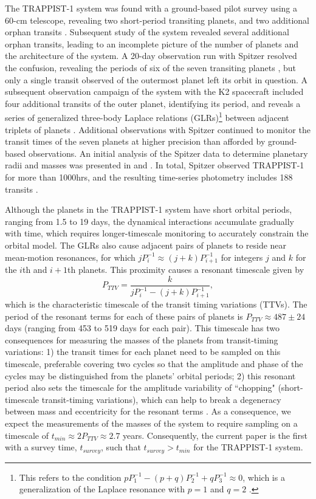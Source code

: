 \documentclass[twocolumn]{aastex63}
\begin{document}
The TRAPPIST-1 system was found with a ground-based pilot survey using a 60-cm telescope,
revealing two short-period transiting planets, and two additional orphan transits
\citep{Gillon2016, Burdanov2018}.  Subsequent study of the system revealed several
additional orphan transits, leading to an incomplete picture of the number of planets
and the architecture of the system.  A 20-day observation run with Spitzer resolved the
confusion, revealing the periods of six of the seven transiting planets \citep{Gillon2017},
but only a single transit observed of the outermost planet left its orbit in question.
A subsequent observation campaign of the system with the K2 spacecraft included four
additional transits of the outer planet, identifying its period, and reveals a series
of generalized three-body Laplace relations (GLRs)\footnote{This refers to the condition
$pP_1^{-1}-(p+q)P_2^{-1}+qP_3^{-1} \approx 0$, which is a generalization of the Laplace
resonance with $p=1$ and $q=2$ \citep{Papaloizou2014}. } between adjacent triplets of
planets \citep{Luger2017a}.  Additional observations with Spitzer
continued to monitor the transit times of the seven planets at higher precision than
afforded by ground-based observations. An initial analysis of the Spitzer data to determine
planetary radii and masses was presented in \citet{Delrez2018a} and \citet{Grimm2018}. In total,
Spitzer observed TRAPPIST-1 for more than 1000hrs, and the resulting time-series photometry
includes 188 transits \citep{Ducrot2020}.

Although the planets in the TRAPPIST-1 system have short orbital periods, ranging from
1.5 to 19 days, the dynamical interactions accumulate gradually with time, which requires
longer-timescale monitoring to accurately constrain the orbital model.
The GLRs also cause adjacent pairs of planets to reside near mean-motion resonances,
for which $j P_i^{-1} \approx (j+k) P_{i+1}^{-1}$ for integers $j$ and $k$ for the $i$th and $i+1$th planets.  This proximity causes a resonant timescale
given by
\begin{equation}
    P_{TTV} = \frac{k}{j P_i^{-1} - (j+k) P_{i+1}^{-1}},
\end{equation}
which is the characteristic timescale of the transit timing variations (TTVs).
The period of the resonant terms for each of these pairs of planets is $P_{TTV} \approx 487\pm 24$
days (ranging from 453 to 519 days for each pair).  This timescale has two consequences for
measuring the masses of the planets from transit-timing variations:  1)  the transit times
for each planet need to be sampled on this timescale, preferable covering two cycles so that
the amplitude and phase of the cycles may be distinguished from the planets' orbital periods;
2) this resonant period also sets the timescale for the amplitude variability of ``chopping" (short-timescale
transit-timing variations), which can help to break a degeneracy between mass and eccentricity for the resonant terms
\citep{Lithwick2012,Deck2015}.  As a consequence, we expect the measurements of the masses
of the system to require sampling on a timescale of $t_{min} \approx 2 P_{TTV} \approx 2.7$ years.
Consequently, the current paper is the first with a survey time, $t_{survey}$, such that $t_{survey} {>} t_{min}$ for the TRAPPIST-1 system.
\end{document}

